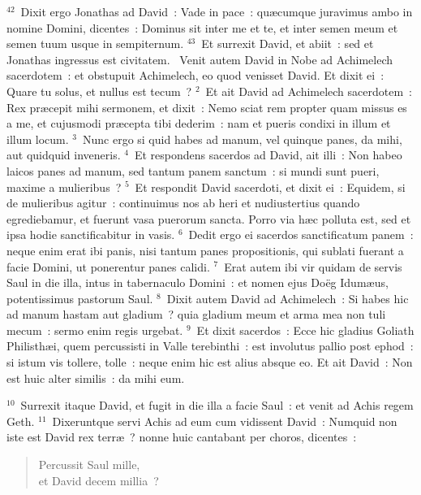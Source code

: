 ${}^{42}$~Dixit ergo Jonathas ad David~: Vade in pace~: qu\ae cumque juravimus ambo in nomine Domini, dicentes~: Dominus sit inter me et te, et inter semen meum et semen tuum usque in sempiternum.
${}^{43}$~Et surrexit David, et abiit~: sed et Jonathas ingressus est civitatem.
~\lettrine[lines=10,image=true,loversize=0.05,lraise=-0.03]{V}{}enit autem David in Nobe ad Achimelech sacerdotem~: et obstupuit Achimelech, eo quod venisset David. Et dixit ei~: Quare tu solus, et nullus est tecum~?
${}^{2}$~Et ait David ad Achimelech sacerdotem~: Rex pr\ae cepit mihi sermonem, et dixit~: Nemo sciat rem propter quam missus es a me, et cujusmodi pr\ae cepta tibi dederim~: nam et pueris condixi in illum et illum locum.
${}^{3}$~Nunc ergo si quid habes ad manum, vel quinque panes, da mihi, aut quidquid inveneris.
${}^{4}$~Et respondens sacerdos ad David, ait illi~: Non habeo laicos panes ad manum, sed tantum panem sanctum~: si mundi sunt pueri, maxime a mulieribus~?
${}^{5}$~Et respondit David sacerdoti, et dixit ei~: Equidem, si de mulieribus agitur~: continuimus nos ab heri et nudiustertius quando egrediebamur, et fuerunt vasa puerorum sancta. Porro via h\ae c polluta est, sed et ipsa hodie sanctificabitur in vasis.
${}^{6}$~Dedit ergo ei sacerdos sanctificatum panem~: neque enim erat ibi panis, nisi tantum panes propositionis, qui sublati fuerant a facie Domini, ut ponerentur panes calidi.
${}^{7}$~Erat autem ibi vir quidam de servis Saul in die illa, intus in tabernaculo Domini~: et nomen ejus Do\"eg Idum\ae us, potentissimus pastorum Saul.
${}^{8}$~Dixit autem David ad Achimelech~: Si habes hic ad manum hastam aut gladium~? quia gladium meum et arma mea non tuli mecum~: sermo enim regis urgebat.
${}^{9}$~Et dixit sacerdos~: Ecce hic gladius Goliath Philisth\ae i, quem percussisti in Valle terebinthi~: est involutus pallio post ephod~: si istum vis tollere, tolle~: neque enim hic est alius absque eo. Et ait David~: Non est huic alter similis~: da mihi eum.


${}^{10}$~Surrexit itaque David, et fugit in die illa a facie Saul~: et venit ad Achis regem Geth.
${}^{11}$~Dixeruntque servi Achis ad eum cum vidissent David~: Numquid non iste est David rex terr\ae~? nonne huic cantabant per choros, dicentes~: \begin{flushleft}\begin{verse}Percussit Saul mille,\\ et David decem millia~?\end{verse}\end{flushleft}



